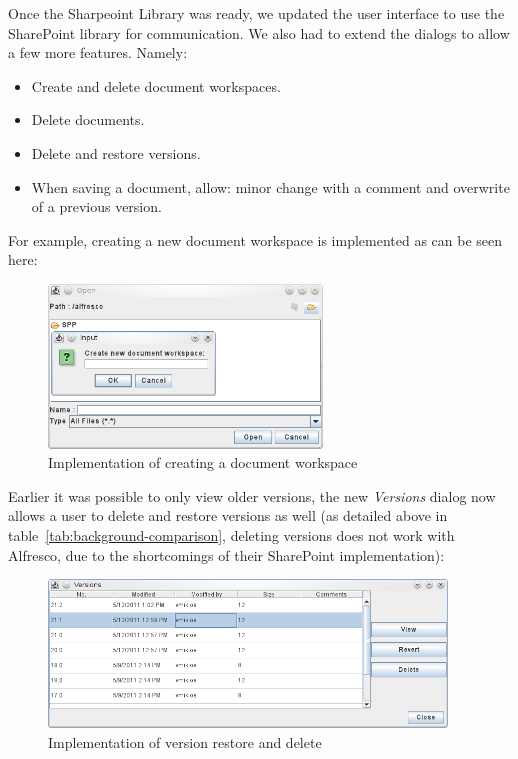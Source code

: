 Once the Sharpeoint Library was ready, we updated the user interface to use the
SharePoint library for communication. We also had to extend the dialogs to allow
a few more features. Namely:

\begin{itemize}
\item Create and delete document workspaces.
\item Delete documents.
\item Delete and restore versions.
\item When saving a document, allow: minor change with a comment and overwrite of a previous version.
\end{itemize}

For example, creating a new document workspace is implemented as can be seen
here:

\begin{figure}[H]
\centering
\includegraphics[width=275px,keepaspectratio]{implementation-createdws.png}
\caption{Implementation of creating a document workspace}
\end{figure}

Earlier it was possible to only view older versions, the new \emph{Versions}
dialog now allows a user to delete and restore versions as well (as detailed
above in table~\ref{tab:background-comparison}, deleting versions does not work
with Alfresco, due to the shortcomings of their SharePoint implementation):

\begin{figure}[H]
\centering
\includegraphics[width=400px,keepaspectratio]{implementation-versiondialog.png}
\caption{Implementation of version restore and delete}
\end{figure}

